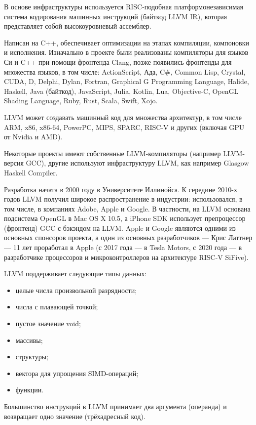 В основе инфраструктуры используется RISC-подобная платформонезависимая система кодирования машинных инструкций (байткод LLVM IR), которая представляет собой высокоуровневый ассемблер.

Написан на C++, обеспечивает оптимизации на этапах компиляции, компоновки и исполнения.
Изначально в проекте были реализованы компиляторы для языков Си и C++ при помощи фронтенда Clang, позже появились фронтенды для множества языков, в том числе: ActionScript, Ада, C\#, Common Lisp, Crystal, CUDA, D, Delphi, Dylan, Fortran, Graphical G Programming Language, Halide, Haskell, Java (байткод), JavaScript, Julia, Kotlin, Lua, Objective-C, OpenGL Shading Language, Ruby, Rust, Scala, Swift, Xojo.

LLVM может создавать машинный код для множества архитектур, в том числе ARM, x86, x86-64, PowerPC, MIPS, SPARC, RISC-V и других (включая GPU от Nvidia и AMD).

Некоторые проекты имеют собственные LLVM-компиляторы (например LLVM-версия GCC), другие используют инфраструктуру LLVM, как например Glasgow Haskell Compiler.

Разработка начата в 2000 году в Университете Иллинойса. К середине 2010-х годов LLVM получил широкое распространение в индустрии: использовался, в том числе, в компаниях Adobe, Apple и Google. В частности, на LLVM основана подсистема OpenGL в Mac OS X 10.5, а iPhone SDK использует препроцессор (фронтенд) GCC с бэкэндом на LLVM. Apple и Google являются одними из основных спонсоров проекта, а один из основных разработчиков — Крис Латтнер — 11 лет проработал в Apple (с 2017 года — в Tesla Motors, с 2020 года — в разработчике процессоров и микроконтроллеров на архитектуре RISC-V SiFive).

LLVM поддерживает следующие типы данных:
\begin{itemize}
	\item целые числа произвольной разрядности;
	\item числа с плавающей точкой;
	\item пустое значение void;
	\item массивы;
	\item структуры;
	\item вектора для упрощения SIMD-операций;
	\item функции.
\end{itemize}

Большинство инструкций в LLVM принимает два аргумента (операнда) и возвращает одно значение (трёхадресный код).

